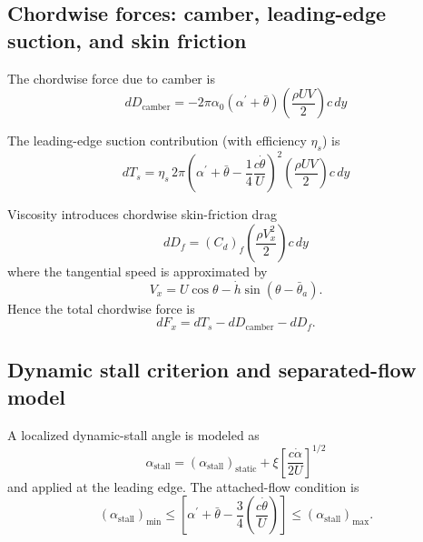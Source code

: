 \documentclass[11pt,a4paper]{article}
\begin{document}
\subsection{Chordwise forces: camber, leading-edge suction, and skin friction}
The chordwise force due to camber is
\begin{equation}
dD_{\text{camber}}=-2\pi\alpha_0(\alpha^\prime+\bar{\theta})\left(\frac{\rho U V}{2}\right)c\,dy
\tag{17}\label{eq:17}
\end{equation}

The leading-edge suction contribution (with efficiency $\eta_s$) is
\begin{equation}
dT_s=\eta_s\,2\pi\left(\alpha^\prime+\bar{\theta}-\frac{1}{4}\frac{c\dot{\theta}}{U}\right)^2
\left(\frac{\rho U V}{2}\right)c\,dy
\tag{18}\label{eq:18}
\end{equation}

Viscosity introduces chordwise skin-friction drag
\begin{equation}
dD_f=\left(C_d\right)_f\left(\frac{\rho V_x^2}{2}\right)c\,dy
\tag{19}\label{eq:19}
\end{equation}
where the tangential speed is approximated by
\begin{equation}
V_x=U\cos\theta-\dot{h}\sin(\theta-\bar{\theta}_a).
\tag{20}\label{eq:20}
\end{equation}
Hence the total chordwise force is
\begin{equation}
dF_x=dT_s-dD_{\text{camber}}-dD_f.
\tag{21}\label{eq:21}
\end{equation}

\subsection{Dynamic stall criterion and separated-flow model}
A localized dynamic-stall angle is modeled as
\begin{equation}
\alpha_{\text{stall}}=\left(\alpha_{\text{stall}}\right)_{\text{static}}+\xi\left[\frac{c\dot{\alpha}}{2U}\right]^{1/2}
\tag{22}\label{eq:22}
\end{equation}
and applied at the leading edge. The attached-flow condition is
\begin{equation}
\left(\alpha_{\text{stall}}\right)_{\min}\le
\left[\alpha^\prime+\bar{\theta}-\frac{3}{4}\left(\frac{c\dot{\theta}}{U}\right)\right]\le
\left(\alpha_{\text{stall}}\right)_{\max}.
\tag{23}\label{eq:23}
\end{equation}
\end{document}
